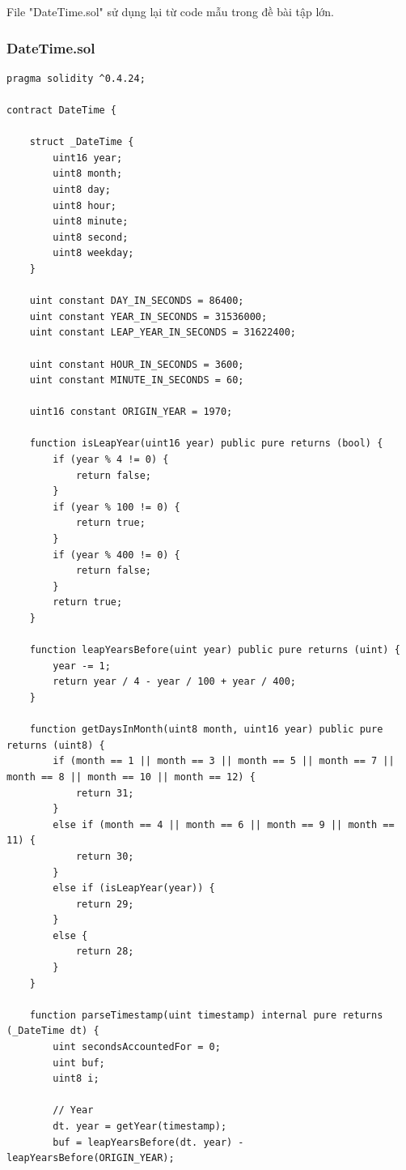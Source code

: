 \documentclass[a4paper]{article}
\begin{document}
File "DateTime.sol" sử dụng lại từ code mẫu trong đề bài tập lớn.

\begin{frame}
\frametitle{DateTime.sol}
\begin{lstlisting}[basicstyle=\small]
pragma solidity ^0.4.24;

contract DateTime {

    struct _DateTime {
        uint16 year;
        uint8 month;
        uint8 day;
        uint8 hour;
        uint8 minute;
        uint8 second;
        uint8 weekday;
    }

    uint constant DAY_IN_SECONDS = 86400;
    uint constant YEAR_IN_SECONDS = 31536000;
    uint constant LEAP_YEAR_IN_SECONDS = 31622400;

    uint constant HOUR_IN_SECONDS = 3600;
    uint constant MINUTE_IN_SECONDS = 60;

    uint16 constant ORIGIN_YEAR = 1970;

    function isLeapYear(uint16 year) public pure returns (bool) {
        if (year % 4 != 0) {
            return false;
        }
        if (year % 100 != 0) {
            return true;
        }
        if (year % 400 != 0) {
            return false;
        }
        return true;
    }

    function leapYearsBefore(uint year) public pure returns (uint) {
        year -= 1;
        return year / 4 - year / 100 + year / 400;
    }

    function getDaysInMonth(uint8 month, uint16 year) public pure returns (uint8) {
        if (month == 1 || month == 3 || month == 5 || month == 7 || month == 8 || month == 10 || month == 12) {
            return 31;
        }
        else if (month == 4 || month == 6 || month == 9 || month == 11) {
            return 30;
        }
        else if (isLeapYear(year)) {
            return 29;
        }
        else {
            return 28;
        }
    }
    
    function parseTimestamp(uint timestamp) internal pure returns (_DateTime dt) {
        uint secondsAccountedFor = 0;
        uint buf;
        uint8 i;

        // Year
        dt. year = getYear(timestamp);
        buf = leapYearsBefore(dt. year) - leapYearsBefore(ORIGIN_YEAR);


\end{lstlisting}
\end{frame}
\end{document}
